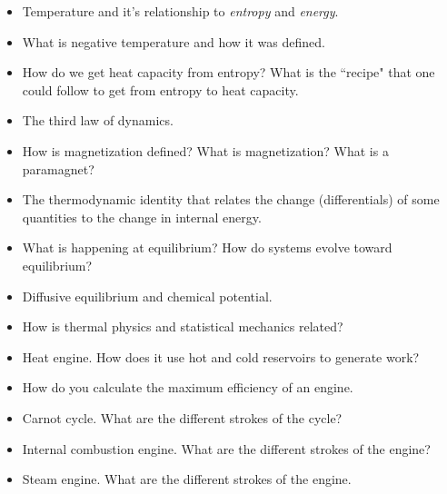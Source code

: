 \vspace{0.2cm}
\begin{itemize}[itemsep=0pt,parsep=0pt,topsep=0pt,partopsep=0pt]
\item Temperature and it's relationship to {\it entropy} and {\it energy}.
\item What is negative temperature and how it was defined.
\item How do we get heat capacity from entropy? What is the ``recipe"
that one could follow to get from entropy to heat capacity.
\item The third law of dynamics.
\item How is magnetization defined? What is magnetization? What is a paramagnet?
\item The thermodynamic identity that relates the change (differentials) of some
quantities to the change in internal energy.
\item What is happening at equilibrium? How do systems evolve toward equilibrium?
\item Diffusive equilibrium and chemical potential.
\item How is thermal physics and statistical mechanics related?
\end{itemize}

\vspace{0.2cm}
\begin{itemize}[itemsep=0pt,parsep=0pt,topsep=0pt,partopsep=0pt]
\item Heat engine. How does it use hot and cold reservoirs to
generate work?
\item How do you calculate the maximum efficiency of an engine.
\item Carnot cycle. What are the different strokes of the cycle?
\item Internal combustion engine. What are the different
strokes of the engine?
\item Steam engine. What are the different strokes of the engine.
\end{itemize}



